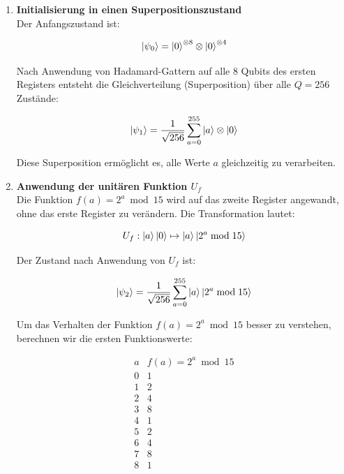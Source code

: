 \begin{enumerate}
    \item \textbf{Initialisierung in einen Superpositionszustand} \\
    Der Anfangszustand ist:

    \[
    \ket{\psi_0} = \ket{0}^{\otimes 8} \otimes \ket{0}^{\otimes 4}
    \]

    Nach Anwendung von Hadamard-Gattern auf alle 8 Qubits des ersten Registers entsteht die Gleichverteilung (Superposition) über alle \( Q = 256 \) Zustände:

    \[
    \ket{\psi_1} = \frac{1}{\sqrt{256}} \sum_{a=0}^{255} \ket{a} \otimes \ket{0}
    \]

    Diese Superposition ermöglicht es, alle Werte \( a \) gleichzeitig zu verarbeiten.\\

    \item \textbf{Anwendung der unitären Funktion \( U_f \)} \\

    Die Funktion \( f(a) = 2^a \bmod 15 \) wird auf das zweite Register angewandt, ohne das erste Register zu verändern. Die Transformation lautet:

    \[
    U_f: \ket{a} \ket{0} \mapsto \ket{a} \ket{2^a \bmod 15}
    \]

    Der Zustand nach Anwendung von \( U_f \) ist:

    \[
    \ket{\psi_2} = \frac{1}{\sqrt{256}} \sum_{a=0}^{255} \ket{a} \ket{2^a \bmod 15}
    \]

    Um das Verhalten der Funktion \( f(a) = 2^a \bmod 15 \) besser zu verstehen, berechnen wir die ersten Funktionswerte:

    \[
    \begin{array}{c|c}
    a & f(a) = 2^a \bmod 15 \\
    \hline
    0 & 1 \\
    1 & 2 \\
    2 & 4 \\
    3 & 8 \\
    4 & 1 \\
    5 & 2 \\
    6 & 4 \\
    7 & 8 \\
    8 & 1 \\
    \end{array}
    \]


\end{enumerate}
